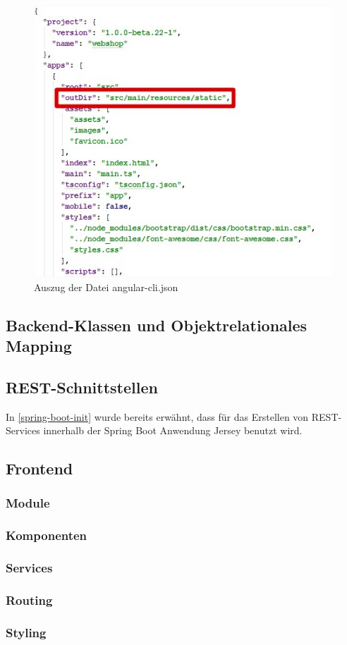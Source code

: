 \begin{figure}[th!]
	\centering
	\includegraphics[width=0.8\linewidth]{bilder/kap7/angular-cli}
	\caption{Auszug der Datei angular-cli.json}
	\label{fig:angular-cli}
\end{figure}

\subsection{Backend-Klassen und Objektrelationales Mapping}

\subsection{REST-Schnittstellen}

In \cref{spring-boot-init} wurde bereits erwähnt, dass für das Erstellen von REST-Services innerhalb der Spring Boot Anwendung Jersey benutzt wird. 

\subsection{Frontend}

\subsubsection{Module}

\subsubsection{Komponenten}

\subsubsection{Services}

\subsubsection{Routing}

\subsubsection{Styling}
